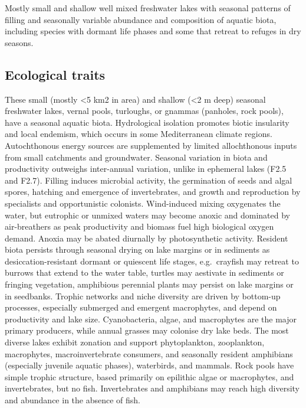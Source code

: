 \documentclass[
  letterpaper,
  DIV=11,
  numbers=noendperiod]{scrartcl}
\begin{document}
Mostly small and shallow well mixed freshwater lakes with seasonal
patterns of filling and seasonally variable abundance and composition of
aquatic biota, including species with dormant life phases and some that
retreat to refuges in dry seasons.

\subsection{Ecological traits}\label{ecological-traits-10}

These small (mostly \textless5 km2 in area) and shallow (\textless2 m
deep) seasonal freshwater lakes, vernal pools, turloughs, or gnammas
(panholes, rock pools), have a seasonal aquatic biota. Hydrological
isolation promotes biotic insularity and local endemism, which occurs in
some Mediterranean climate regions. Autochthonous energy sources are
supplemented by limited allochthonous inputs from small catchments and
groundwater. Seasonal variation in biota and productivity outweighs
inter-annual variation, unlike in ephemeral lakes (F2.5 and F2.7).
Filling induces microbial activity, the germination of seeds and algal
spores, hatching and emergence of invertebrates, and growth and
reproduction by specialists and opportunistic colonists. Wind-induced
mixing oxygenates the water, but eutrophic or unmixed waters may become
anoxic and dominated by air-breathers as peak productivity and biomass
fuel high biological oxygen demand. Anoxia may be abated diurnally by
photosynthetic activity. Resident biota persists through seasonal drying
on lake margins or in sediments as desiccation-resistant dormant or
quiescent life stages, e.g.~crayfish may retreat to burrows that extend
to the water table, turtles may aestivate in sediments or fringing
vegetation, amphibious perennial plants may persist on lake margins or
in seedbanks. Trophic networks and niche diversity are driven by
bottom-up processes, especially submerged and emergent macrophytes, and
depend on productivity and lake size. Cyanobacteria, algae, and
macrophytes are the major primary producers, while annual grasses may
colonise dry lake beds. The most diverse lakes exhibit zonation and
support phytoplankton, zooplankton, macrophytes, macroinvertebrate
consumers, and seasonally resident amphibians (especially juvenile
aquatic phases), waterbirds, and mammals. Rock pools have simple trophic
structure, based primarily on epilithic algae or macrophytes, and
invertebrates, but no fish. Invertebrates and amphibians may reach high
diversity and abundance in the absence of fish.
\end{document}
